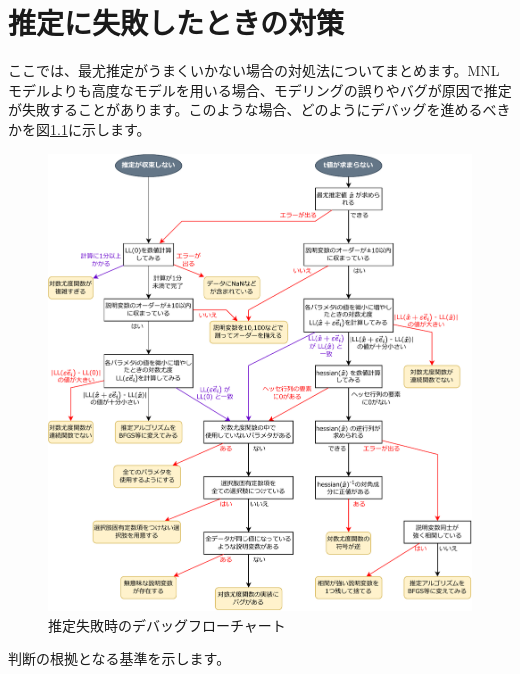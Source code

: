 \chapter{推定に失敗したときの対策}\label{failure}

ここでは、最尤推定がうまくいかない場合の対処法についてまとめます。MNLモデルよりも高度なモデルを用いる場合、モデリングの誤りやバグが原因で推定が失敗することがあります。このような場合、どのようにデバッグを進めるべきかを図\ref{fig:estimation_failure}に示します。

\begin{figure}[ht]
    \centering
    \includegraphics[width=0.98\hsize]{figure/estimation_failure.pdf}
    \caption{推定失敗時のデバッグフローチャート}
    \label{fig:estimation_failure}
\end{figure}

判断の根拠となる基準を示します。

